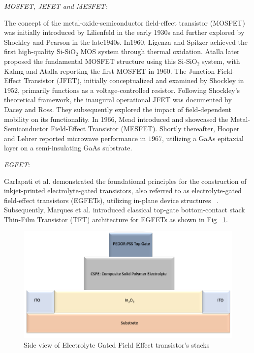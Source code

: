    \textit{MOSFET, JEFET and MESFET:}
   
The concept of the metal-oxide-semiconductor field-effect transistor (MOSFET) was initially introduced by Lilienfeld in the early 1930s and further explored by Shockley and Pearson in the late$ 1940$s. In$ 1960$, Ligenza and Spitzer achieved the first high-quality Si-SiO₂ MOS system through thermal oxidation. Atalla later proposed the fundamental MOSFET structure using this Si-SiO₂ system, with Kahng and Atalla reporting the first MOSFET in $1960$. 
The Junction Field-Effect Transistor (JFET), initially conceptualized and examined by Shockley in $1952$, primarily functions as a voltage-controlled resistor. Following Shockley's theoretical framework, the inaugural operational JFET was documented by Dacey and Ross. They subsequently explored the impact of field-dependent mobility on its functionality. In 1966, Mead introduced and showcased the Metal-Semiconductor Field-Effect Transistor (MESFET). Shortly thereafter, Hooper and Lehrer reported microwave performance in $1967$, utilizing a GaAs epitaxial layer on a semi-insulating GaAs substrate.
~\cite{ref14}

  \textit{EGFET}:
 
Garlapati et al. demonstrated the foundational principles for the construction of inkjet-printed electrolyte-gated transistors, also referred to as electrolyte-gated field-effect transistors (EGFETs), utilizing in-plane device structures ~\cite{ref73}. Subsequently, Marques et al. introduced classical top-gate bottom-contact stack Thin-Film Transistor (TFT) architecture for EGFETs as shown in Fig ~\ref{fig13}.
  \begin{figure}[h!]
\centering
\includegraphics[width=1\textwidth]{figures/fig13.png}
\caption[Example of caption.]{Side view of Electrolyte Gated Field Effect transistor's stacks  \label{fig13}}
\end{figure}
    


